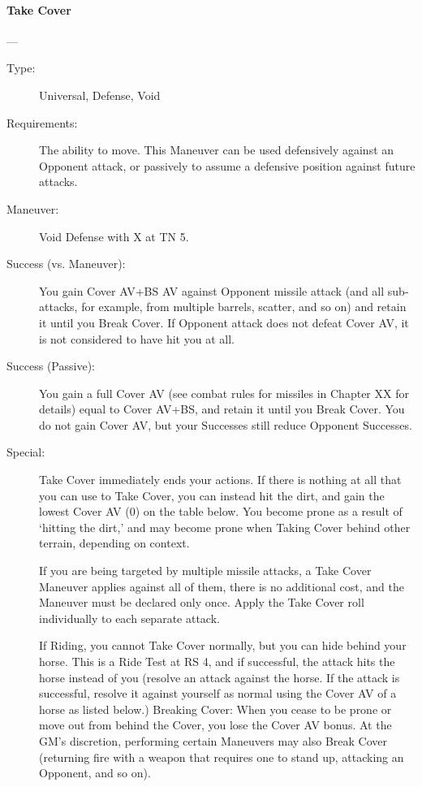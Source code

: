 \documentclass[oneside,11pt,english]{book}
\begin{document}
\paragraph{\large\label{man:Take Cover}Take Cover}---
\vspace{-10pt}\begin{description} 
\item [Type:] Universal, Defense, Void 
\item [Requirements:] The ability to move. This Maneuver can be used defensively against an Opponent attack, or passively to assume a defensive position against future attacks. 
\item [Maneuver:] Void Defense with X at TN 5. 
\item [Success (vs. Maneuver):] You gain Cover AV+BS AV against Opponent missile attack (and all sub-
attacks, for example, from multiple barrels, scatter, and so on) and retain it until you Break Cover. If 
Opponent attack does not defeat Cover AV, it is not considered to have hit you at all. 
\item [Success (Passive):] You gain a full Cover AV (see combat rules for missiles in Chapter XX for details) equal to Cover AV+BS, and retain it until you Break Cover.
\subitem [Failure:] You do not gain Cover AV, but your Successes still reduce Opponent Successes.
\item [Special:] Take Cover immediately ends your actions. If there is nothing at all that you can use to Take Cover, you can instead hit the dirt, and gain the lowest Cover AV (0) on the table below. You become prone as a result of ‘hitting the dirt,’ and may become prone when Taking Cover behind other terrain, depending on context.\par
If you are being targeted by multiple missile attacks, a Take Cover Maneuver applies against all of them, there is no additional cost, and the Maneuver must be declared only once. Apply the Take Cover roll individually to each separate attack.\par
If Riding, you cannot Take Cover normally, but you can hide behind your horse. This is a Ride Test at RS 4, and if successful, the attack hits the horse instead of you (resolve an attack against the horse. If the attack is successful, resolve it against yourself as normal using the Cover AV of a horse as listed below.) Breaking Cover: When you cease to be prone or move out from behind the Cover, you lose the Cover AV bonus. At the GM’s discretion, performing certain Maneuvers may also Break Cover (returning fire with a weapon that requires one to stand up, attacking an Opponent, and so on).
\end{description}
\end{document}
